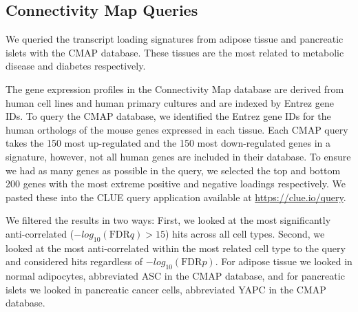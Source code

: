 \documentclass[
]{article}
\begin{document}
\subsection{Connectivity Map Queries}\label{connectivity-map-queries}

We queried the transcript loading signatures from adipose tissue and
pancreatic islets with the CMAP database. These tissues are the most
related to metabolic disease and diabetes respectively.

The gene expression profiles in the Connectivity Map database are
derived from human cell lines and human primary cultures and are indexed
by Entrez gene IDs. To query the CMAP database, we identified the Entrez
gene IDs for the human orthologs of the mouse genes expressed in each
tissue. Each CMAP query takes the 150 most up-regulated and the 150 most
down-regulated genes in a signature, however, not all human genes are
included in their database. To ensure we had as many genes as possible
in the query, we selected the top and bottom 200 genes with the most
extreme positive and negative loadings respectively. We pasted these
into the CLUE query application available at
\url{https://clue.io/query}.

We filtered the results in two ways: First, we looked at the most
significantly anti-correlated (\(-log_{10}(\mathrm{FDR} q) > 15\)) hits
across all cell types. Second, we looked at the most anti-correlated
within the most related cell type to the query and considered hits
regardless of \(-log_{10}(\mathrm{FDR} p)\). For adipose tissue we
looked in normal adipocytes, abbreviated ASC in the CMAP database, and
for pancreatic islets we looked in pancreatic cancer cells, abbreviated
YAPC in the CMAP database.



\end{document}
